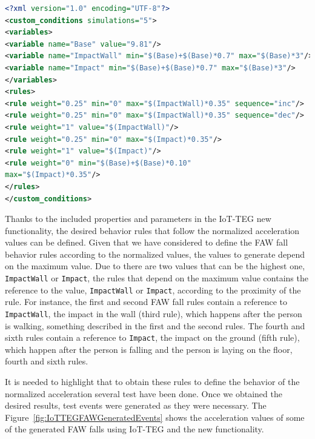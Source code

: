 \documentclass[10pt,journal,compsoc]{IEEEtran}
\begin{document}
\begin{lstlisting}[basicstyle=\ttfamily\footnotesize,language=XML,caption={Rules to define a FAW fall, cf.\cite{LorenaFall}.},label=FAWFallRules, breaklines=true]
<?xml version="1.0" encoding="UTF-8"?>
<custom_conditions simulations="5">
<variables>
<variable name="Base" value="9.81"/>
<variable name="ImpactWall" min="$(Base)+$(Base)*0.7" max="$(Base)*3"/>
<variable name="Impact" min="$(Base)+$(Base)*0.7" max="$(Base)*3"/>
</variables>
<rules>
<rule weight="0.25" min="0" max="$(ImpactWall)*0.35" sequence="inc"/>
<rule weight="0.25" min="0" max="$(ImpactWall)*0.35" sequence="dec"/>
<rule weight="1" value="$(ImpactWall)"/>
<rule weight="0.25" min="0" max="$(Impact)*0.35"/>
<rule weight="1" value="$(Impact)"/>
<rule weight="0" min="$(Base)+$(Base)*0.10"
max="$(Impact)*0.35"/>
</rules>
</custom_conditions>
\end{lstlisting}

Thanks to the included properties and parameters in the IoT-TEG new functionality, the desired behavior rules that
follow the normalized acceleration values can be defined. Given that we have considered to define the FAW fall behavior
rules according to the normalized values, the values to generate depend on the maximum value. Due to there are two 
values that can be the highest one, \texttt{ImpactWall} or \texttt{Impact}, the rules that depend on the maximum 
value contains the reference to the value, \texttt{ImpactWall} or \texttt{Impact}, according to the proximity
of the rule. For instance, the first and second FAW fall rules contain a reference to \texttt{ImpactWall}, the impact 
in the wall (third rule), which happens after the person is walking, something described in the first and the second rules.
The fourth and sixth rules contain a reference to \texttt{Impact}, the impact on the ground (fifth rule), which happen
after the person is falling and the person is laying on the floor, fourth and sixth rules.

It is needed to highlight that to obtain these rules to define the behavior of the normalized acceleration several test have been done. Once we obtained the desired results, test events were generated as they were necessary. The Figure~\ref{fig:IoTTEGFAWGeneratedEvents} shows the acceleration values of some of the generated FAW falls using IoT-TEG and the new functionality.
\end{document}
